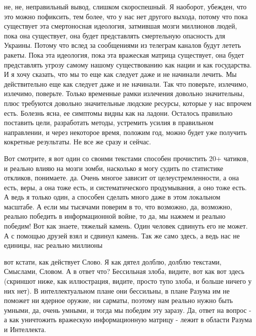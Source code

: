 не, не, неправильный вывод, слишком скороспешный. Я наоборот, убежден, что это можно пофиксить, тем более, что у нас нет другого выхода, потому что пока существует эта смертоносная идеология, затмившая мозги миллионов людей, пока она существует, она будет представлять смертельную опасность для Украины. Потому что вслед за сообщениями из телеграм каналов будут лететь ракеты. Пока эта идеология, пока эта вражеская матрица существует, она будет представлять угрозу самому нашому существованию как нации и как государства. И я хочу сказать, что мы то еще как следует даже и не начинали лечить. Мы действительно еще как следует даже и не начинали. Так что поверьте, излечимо, излечимо, поверьте. Только временные рамки излечения довольно значительны, плюс требуются довольно значительные людские ресурсы, которые у нас впрочем есть. Болезнь ясна, ее симптомы видны как на ладони. Осталось правильно поставить цели, разработать методы, устремить усилия в правильном направлении, и через некоторое время, положим год, можно будет уже получить кокретные результаты. Не все же сразу и сейчас.

Вот смотрите, я вот один со своими текстами способен прочистить 20+ чатиков, и
реально влияю на мозги зомби, насколько я могу судить по статистике откликов,
понимаете. да. Очень многое зависит от целеустремленности, а она есть, веры, а
она тоже есть, и систематического продумывания, а оно тоже есть. А ведь я
только один, а способен сделать много даже в этом локальном масштабе. А если мы
тысячами поверим в то, что возможно, да, возможно, реально победить в
информационной войне, то да, мы нажмем и реально победим! Вот как знаете,
тяжелый камень. Один человек сдвинуть его не может. А с помощью друзей взял и
сдвинул камень. Так же само здесь, а ведь нас не единицы, нас реально миллионы

вот кстати, как действует Слово. Я как дятел долблю, долблю текстами, Смыслами,
Словом. А в ответ что? Бессильная злоба, видите, вот как вот здесь (скриншот
ниже, как иллюстрация, видите, просто тупо злоба, и больше ничего у них нет). В
интеллектуальном плане они бессильны, в плане Разума им не поможет ни ядерное
оружие, ни сарматы, поэтому нам реально нужно быть умными, да, очень умными, и
тогда мы победим эту заразу. Да, ответ на вопрос - а как уничтожить вражескую
информационную матрицу - лежит в области Разума и Интеллекта.
